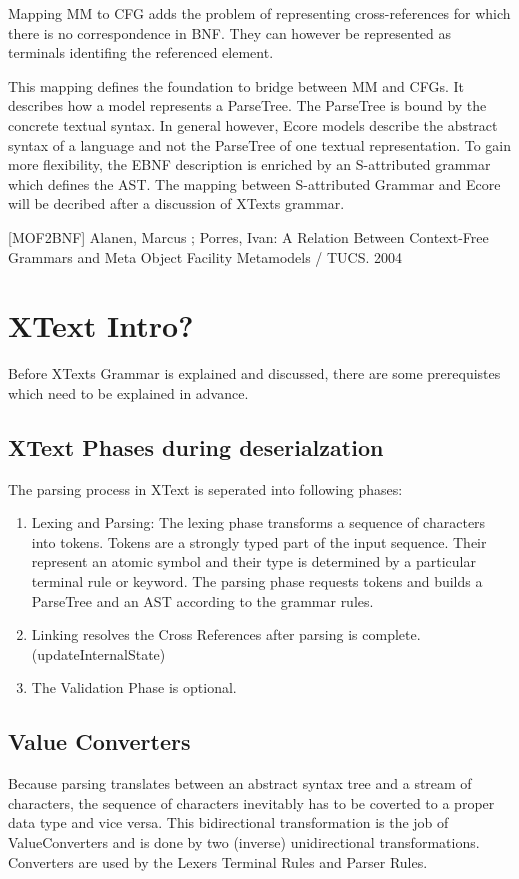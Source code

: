 Mapping MM to CFG adds the problem of representing cross-references for which there is no correspondence in BNF. They can however be represented as terminals identifing the referenced element.   

This mapping defines the foundation to bridge between MM and CFGs. It describes how a model represents a ParseTree. The ParseTree is bound by the concrete textual syntax. In general however, Ecore models describe the abstract syntax of a language and not the ParseTree of one textual representation. To gain more flexibility, the EBNF description is enriched by an S-attributed grammar which defines the AST. The mapping between S-attributed Grammar and Ecore will be decribed after a discussion of XTexts grammar. 

[MOF2BNF]
Alanen, Marcus ; Porres, Ivan: A Relation Between Context-Free Grammars
and Meta Object Facility Metamodels / TUCS. 2004

\section{XText Intro?}
Before XTexts Grammar is explained and discussed, there are some prerequistes which need to be explained in advance.

\subsection{XText Phases during deserialzation}
The parsing process in XText is seperated into following phases:
\begin{enumerate}
	\item Lexing and Parsing: The lexing phase transforms a sequence of characters into tokens. Tokens are a strongly typed part of the input sequence. Their represent an atomic symbol and their type is determined by a particular terminal rule or keyword. The parsing phase requests tokens and builds a ParseTree and an AST according to the grammar rules.
	\item Linking resolves the Cross References after parsing is complete. (updateInternalState)
	\item The Validation Phase is optional.
\end{enumerate}

\subsection{Value Converters}
Because parsing translates between an abstract syntax tree and a stream of characters, the sequence of characters inevitably has to be coverted to a proper data type and vice versa. This bidirectional transformation is the job of ValueConverters and is done by two (inverse) unidirectional transformations. Converters are used by the Lexers Terminal Rules and Parser Rules.

